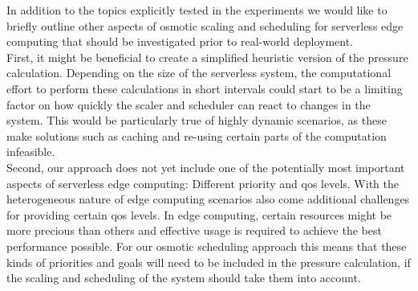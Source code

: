 In addition to the topics explicitly tested in the experiments we would like to briefly outline other aspects of osmotic scaling and scheduling for serverless edge computing that should be investigated prior to real-world deployment.\\
First, it might be beneficial to create a simplified heuristic version of the pressure calculation. Depending on the size of the serverless system, the computational effort to perform these calculations in short intervals could start to be a limiting factor on how quickly the scaler and scheduler can react to changes in the system.
This would be particularly true of highly dynamic scenarios, as these make solutions such as caching and re-using certain parts of the computation infeasible.\\
Second, our approach does not yet include one of the potentially most important aspects of serverless edge computing: Different priority and \gls{qos} levels.
With the heterogeneous nature of edge computing scenarios also come additional challenges for providing certain \gls{qos} levels.
In edge computing, certain resources might be more precious than others and effective usage is required to achieve the best performance possible.
For our osmotic scheduling approach this means that these kinds of priorities and goals will need to be included in the pressure calculation, if the scaling and scheduling of the system should take them into account.
